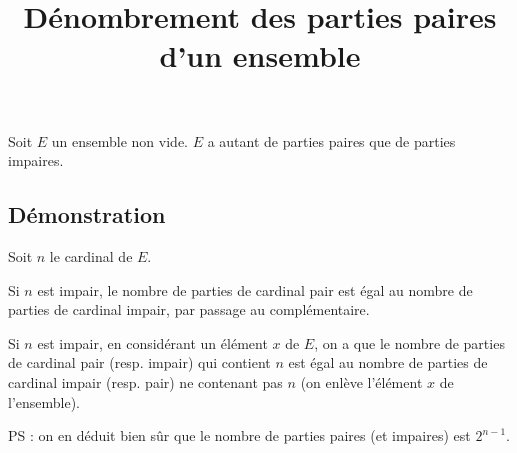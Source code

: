 \documentclass[fontsize=12pt,twoside=false,parskip=half, french]{scrartcl}
\title{Dénombrement des parties paires d’un ensemble}
\date{}
\author{}
\begin{document}
\maketitle
   \begin{Theoreme}
      Soit $E$ un ensemble non vide. $E$ a autant de parties paires que de parties impaires.
   \end{Theoreme}
   \subsection{Démonstration}
      
      Soit $n$ le cardinal de $E$. 
      
      Si $n$ est impair, le nombre de parties de cardinal pair est égal au nombre de parties de cardinal impair, 
      par passage au complémentaire. 
      
      Si $n$ est impair, en considérant un élément $x$ de $E$, on a  que le nombre de parties de cardinal pair 
      (resp. impair) qui contient $n$ est égal au nombre de parties de cardinal impair (resp. pair) ne contenant pas $n$
      (on enlève l’élément $x$ de l’ensemble).
      
      PS : on en déduit bien sûr que le nombre de parties paires (et impaires) est $2^{n - 1}$. 
\end{document}
